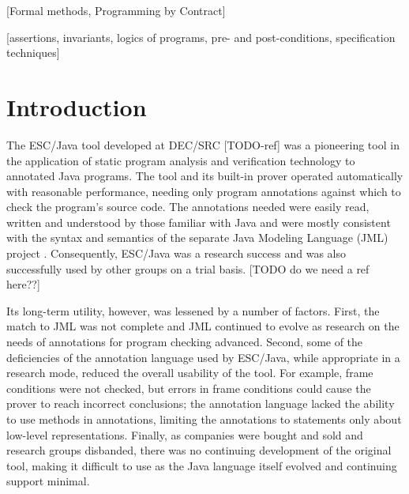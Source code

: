 \documentclass{acm_proc_article-sp}
\begin{document}
[Formal methods, Programming by Contract]

[assertions, invariants, logics of programs,
                pre- and post-conditions, specification techniques]



\section{Introduction}
The ESC/Java tool developed at DEC/SRC [TODO-ref] was a pioneering tool
in the application of static program analysis and verification technology
to annotated Java programs.  The tool and its built-in prover operated 
automatically with reasonable performance, needing only program annotations
against which to check the program's source code.  The annotations needed were
easily read, written and understood by those familiar with Java and were mostly
consistent with the syntax and semantics of the separate Java Modeling Language 
(JML) project \cite{Leavens-etal00}\cite{jmlpapers}.  Consequently, ESC/Java was a
research success and was also successfully used by other groups on a trial 
basis.  [TODO do we need a ref here??]

Its long-term utility, however, was lessened by a number of factors.  First, 
the match to JML was not complete and JML continued to evolve as research on
the needs of annotations for program checking advanced.  Second, some of the
deficiencies of the annotation language used by ESC/Java, while appropriate 
in a research mode, reduced the overall usability of the tool.  For example,
frame conditions were not checked, but errors in frame conditions could cause
the prover to reach incorrect conclusions; the annotation language lacked 
the ability to use methods in annotations, limiting the annotations to statements
only about low-level representations.  Finally,
as companies
were bought and sold and research groups disbanded, there was no continuing
development of the original tool, making it difficult to use as the Java language
itself evolved and continuing support minimal.
\end{document}
